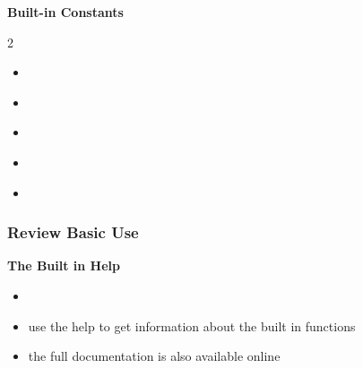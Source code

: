 \documentclass{ltx-talk} %
\newcommand{\sectionIIsubsectionIIItitle}{Review Basic Use}
\begin{document}
\begin{frame}
				\textbf{ Built-in Constants} \\		
				\begin{multicols}{2}
				\begin{itemize}
					\item {} \vspace{1mm}\\
					\item {} \vspace{1mm}\\
					\item {} \vspace{1mm}\\
					\item {} \vspace{1mm}\\
					\item {} \vspace{1mm}\\
				\end{itemize}
				\end{multicols}	
			
				\btVFill 
			\end{frame}

			\begin{frame}
				\frametitle{\sectionIIsubsectionIIItitle}

				\textbf{The Built in Help } \vspace{3mm}\\
				\begin{itemize}	
					\item 	{} \vspace{3mm}\\
					\item use the help to get information about the built in functions  \vspace{3mm}\\
					\item the full documentation is also available online  \vspace{3mm}\\
				\end{itemize}	
			
				\btVFill 
			\end{frame}
\end{document}
